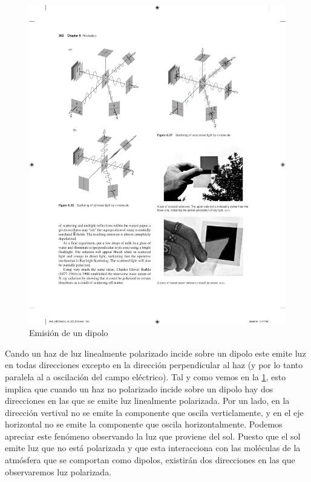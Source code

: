 \documentclass[12pt]{article}
\numberwithin{table}{section}
\numberwithin{figure}{section}
\numberwithin{equation}{section}
\begin{document}
\begin{figure}[htb]
	\small \sffamily \centering
	\includegraphics{dispersion.pdf}
	\caption{Emisión de un dipolo}
	\label{fig:disp}
\end{figure}

Cando un haz de luz linealmente polarizado incide sobre un dipolo este emite luz en todas direcciones excepto en la dirección perpendicular al haz (y por lo tanto paralela al a oscilación del campo eléctrico). Tal y como vemos en la \cref{fig:disp}, esto implica que cuando un haz no polarizado incide sobre un dipolo hay dos direcciones en las que se emite luz linealmente polarizada. Por un lado, en la dirección vertival no se emite la componente que oscila verticlamente, y en el eje horizontal no se emite la componente que oscila horizontalmente. Podemos apreciar este fenómeno observando la luz que proviene del sol. Puesto que el sol emite luz que no está polarizada y que esta interacciona con las moléculas de la atmósfera que se comportan como dipolos, existirán dos direcciones en las que observaremos luz polarizada.
\end{document}
